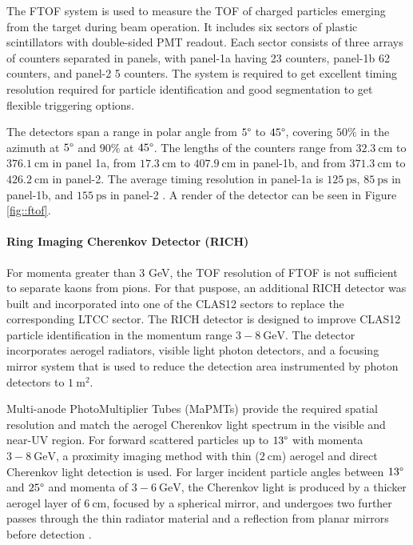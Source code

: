     The FTOF system is used to measure the TOF of charged particles emerging from the target during beam operation.
    It includes six sectors of plastic scintillators with double-sided PMT readout.
    Each sector consists of three arrays of counters separated in panels, with panel-1a having 23 counters, panel-1b 62 counters, and panel-2 5 counters.
    The system is required to get excellent timing resolution required for particle identification and good segmentation to get flexible triggering options.
    
    The detectors span a range in polar angle from $5\degree$ to $45\degree$, covering $50\%$ in the azimuth at $5\degree$ and $90\%$ at $45\degree$.
    The lengths of the counters range from $32.3 ~\text{cm}$ to $376.1 ~\text{cm}$ in panel 1a, from $17.3 ~\text{cm}$ to $407.9 ~\text{cm}$ in panel-1b, and from $371.3 ~\text{cm}$ to $426.2 ~\text{cm}$ in panel-2.
    The average timing resolution in panel-1a is $125 ~\text{ps}$, $85 ~\text{ps}$ in panel-1b, and $155 ~\text{ps}$ in panel-2 \cite{carman2020ftof}.
    A render of the detector can be seen in Figure \ref{fig::ftof}.

\paragraph{Ring Imaging Cherenkov Detector (RICH)}
    For momenta greater than 3 GeV, the TOF resolution of FTOF is not sufficient to separate kaons from pions.
    For that puspose, an additional RICH detector was built and incorporated into one of the CLAS12 sectors to replace the corresponding LTCC sector.
    The RICH detector is designed to improve CLAS12 particle identification in the momentum range $3 - 8 ~\text{GeV}$.
    The detector incorporates aerogel radiators, visible light photon detectors, and a focusing mirror system that is used to reduce the detection area instrumented by photon detectors to $1 ~\text{m}^2$.
    
    Multi-anode PhotoMultiplier Tubes (MaPMTs) provide the required spatial resolution and match the aerogel Cherenkov light spectrum in the visible and near-UV region.
    For forward scattered particles up to $13\degree$ with momenta $3 - 8 ~\text{GeV}$, a proximity imaging method with thin ($2 ~\text{cm}$) aerogel and direct Cherenkov light detection is used.
    For larger incident particle angles between $13\degree$ and $25\degree$ and momenta of $3 - 6 ~\text{GeV}$, the Cherenkov light is produced by a thicker aerogel layer of $6 ~\text{cm}$, focused by a spherical mirror, and undergoes two further passes through the thin radiator material and a reflection from planar mirrors before detection \cite{contalbrigo2020}.

